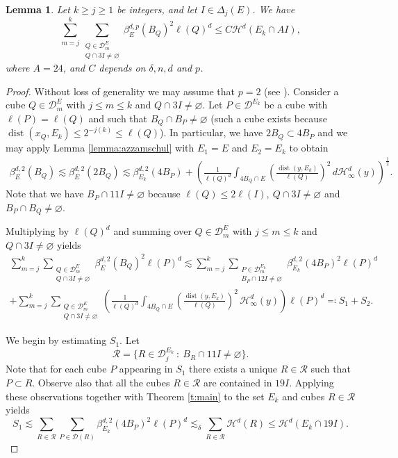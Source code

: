 \documentclass[11pt,reqno]{amsart}
\def\dist{\mathop\mathrm{dist}} 						%
\newcommand{\ps}[1]{\left( #1 \right)}
\newtheorem{lemma}[theorem]{Lemma}
\theoremstyle{definition}
\theoremstyle{remark}
\numberwithin{equation}{section}
\newcommand{\hd}{\mathcal{H}^d}
\newcommand{\hdc}{\mathcal{H}^d_\infty}
\newcommand{\dD}{\mathcal{D}}
\newcommand{\DD}{\mathcal{D}}
\theoremstyle{theorem}
\theoremstyle{definition}
\theoremstyle{remark}
\numberwithin{equation}{section}
\begin{document}
	\begin{lemma} 
		Let $k\ge j \ge 1$ be integers, and let $I\in\Delta_j(E)$. We have
		\begin{equation} \label{e:BJ-a}
		\sum_{m=j}^{k} \sum_{\substack{Q \in \dD^E_m \\ Q \cap 3I \neq \varnothing}} \beta_{E}^{d,p}(B_Q)^2 \ell(Q)^d  \leq C\hd(E_k\cap AI),
		\end{equation}
		where $A=24$, and $C$ depends on $\delta, n, d$ and $p$.
	\end{lemma}
	\begin{proof}
		Without loss of generality we may assume that $p=2$ (see \cite[(A.3)]{azzam2019quantitative}). Consider a cube $Q \in \dD^E_m$ with $j\le m\le k$ and $Q\cap 3I\neq\varnothing$. Let $P\in\DD^{E_k}$ be a cube with $\ell(P)=\ell(Q)$ and such that $B_Q\cap B_P\neq\varnothing$ (such a cube exists because $\dist(x_Q,E_k)\le 2^{-j(k)}\le\ell(Q)$). In particular, we have $2B_Q\subset 4B_{P}$ and we may apply Lemma \ref{lemma:azzamschul} with $E_1=E$ and $E_2 = E_k$ to obtain
		\begin{align*}
		\beta_{E}^{d,2}(B_Q)\lesssim \beta_{E}^{d,2}(2B_Q) \lesssim \beta^{d,2}_{E_k}(4B_{P}) + \ps{ \frac{1}{\ell(Q)^d} \int_{4 B_{Q}\cap E} \ps{\frac{\dist(y, E_k)}{\ell(Q)}}^2 \, d \mathcal{H}_\infty^d(y)}^{\frac{1}{2}}.
		\end{align*}
		Note that we have $B_P\cap 11I\neq\varnothing$ because $\ell(Q)\le 2\ell(I),\ Q\cap 3I\neq\varnothing$ and $B_P\cap B_Q\neq\varnothing$.
		
		Multiplying by $\ell(Q)^d$ and summing over $Q \in \dD^E_m$ with $j\le m\le k$ and $Q\cap 3I\neq\varnothing$ yields
		\begin{multline}\label{e:form101}
		\sum_{m=j}^{k} \sum_{\substack{Q \in \dD^E_m \\ Q \cap 3I \neq \varnothing}} \beta_{E}^{d,2} (B_Q)^2\ell(P)^d 
		\lesssim \sum_{m=j}^{k}\sum_{\substack{P \in \dD_m^{E_k}\\ B_P \cap 12I \neq \varnothing}} \beta^{d,2}_{E_k}(4 B_{P})^2\ell(P)^d \\
		+ \sum_{m=j}^{k} \sum_{\substack{Q \in \dD^E_m \\ Q \cap 3I \neq \varnothing}} \ps{ \frac{1}{\ell(Q)^d} \int_{4 B_Q\cap E} \ps{\frac{ \dist(y, E_k)}{\ell(Q)}}^{2} \, \hdc(y) }\ell(P)^d \eqqcolon S_1+S_2.
		\end{multline}
		
		We begin by estimating $S_1$. Let 
		\begin{equation*}
		\mathcal{R}=\{ R\in \dD^{E_k}_j\ :\ B_R\cap 11I\neq\varnothing\}.
		\end{equation*}
		Note that for each cube $P$ appearing in $S_1$ there exists a unique $R\in\mathcal{R}$ such that $P\subset R$.
		Observe also that all the cubes $R\in\mathcal{R}$ are contained in $19I$. Applying these observations together with Theorem \ref{t:main} to the set $E_k$ and cubes $R\in\mathcal{R}$ yields
		\begin{equation}\label{eq:useATST}
		S_1\lesssim \sum_{R\in\mathcal{R}}\sum_{P\in\dD(R)} \beta^{d,2}_{E_k}(4 B_{P})^2\ell(P)^d  \lesssim_\delta \sum_{R\in\mathcal{R}} \mathcal{H}^d(R) \le \hd(E_k \cap 19I). 
		\end{equation}
		

\end{proof}
\end{document}
